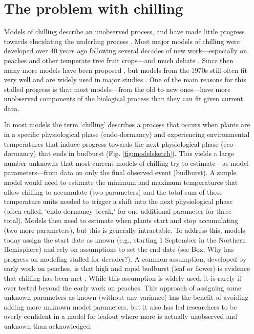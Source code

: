 \documentclass[11pt]{article}
\begin{document}
\section*{The problem with chilling} 
Models of chilling describe an unobserved process, and have made little progress towards elucidating the underling process \citep{chuine2016}. 
Most major models of chilling were developed over 40 years ago \citep{richardson1974} following several decades of new work---especially on peaches and other temperate tree fruit crops---and much debate \citep{dormtreeproc}. Since then many more models have been proposed \citep{luedeling2012chilling,chuine2016}, but models from the 1970s still often fit very well \citep{basler2016evaluating,chuine2016} and are widely used in major studies \citep[e.g.,][]{richardson1974,chuine2016,ospreebbms}. One of the main reasons for this stalled progress is that most models---from the old to new ones---have more unobserved components of the biological process than they can fit given current data. 

In most models the term `chilling' describes a process that occurs when plants are in a specific physiological phase (endo-dormancy) and experiencing environmental temperatures that induce progress towards the next physiological phase (eco-dormancy) that ends in budburst (Fig. \ref{fig:modelsketch}). This yields a large number unknowns that most current models of chilling try to estimate---as model parameters---from data on only the final observed event (budburst). A simple model would need to estimate the minimum and maximum temperatures that allow chilling to accumulate (two parameters) and the total sum of those temperature units needed to trigger a shift into the next physiological phase (often called, `endo-dormancy break,' for one additional parameter for three total). Models then need to estimate  when plants start and stop accumulating (two more parameters), but this is generally intractable. To address this, models today assign the start date as known (e.g., starting 1 September in the Northern Hemisphere) and rely on assumptions to set the end date (see Box: Why has progress on modeling stalled for decades?). A common assumption, developed by early work on peaches, is that high and rapid budburst (leaf or flower) is evidence that chilling has been met \citep{erez1971}. While this assumption is widely used, it is rarely if ever tested beyond the early work on peaches. This approach of assigning some unknown parameters as known (without any variance) has the benefit of avoiding adding more unknown model parameters, but it also has led researchers to be overly confident in a model for leafout where more is actually unobserved and unknown than acknowledged. 
\end{document}
